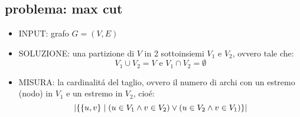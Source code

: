 
\subsection*{problema: max cut}
\begin{flushleft}
	\begin{itemize}
		\item INPUT: grafo $G=(V,E)$
		\item SOLUZIONE: una partizione di $V$ in 2 sottoinsiemi $V_1$ e $V_2$, ovvero tale che:
			$$V_1\cup V_2=V\text{ e }V_1\cap V_2=\emptyset$$
		\item MISURA: la cardinalit\'a del taglio, ovvero il numero di archi con un estremo (nodo) in $V_1$ e un estremo in $V_2$, cio\'e:
			$$\vert\{\{u,v\}\hspace{0.1cm}\vert\hspace{0.1cm}(u\in V_1\land v\in V_2)\lor(u\in V_2\land v\in V_1)\}\vert$$
	\end{itemize}
\end{flushleft}


